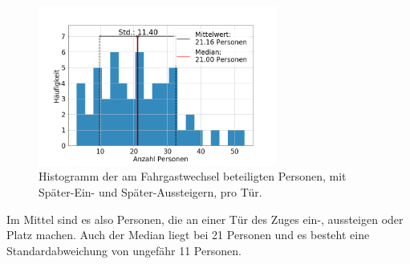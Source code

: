 \begin{figure}[H]
	\centering
		\includegraphics[width=0.7\textwidth]{pictures/data_evaluation/data_description/hist_persons.png}
	\caption{Histogramm der am Fahrgastwechsel beteiligten Personen, mit Später-Ein- und Später-Aussteigern, pro Tür.}
	\label{fig:histAllePersonen}
\end{figure}
Im Mittel sind es also  Personen, die an einer Tür des Zuges ein-, aussteigen oder Platz machen. Auch der Median liegt bei 21 Personen und es besteht eine Standardabweichung von ungefähr 11 Personen.
